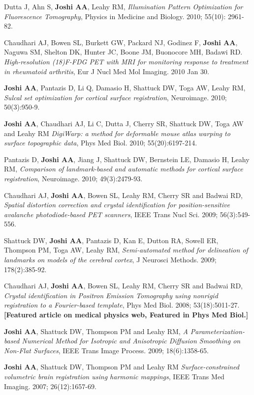 \documentclass[overlapped,line,letterpaper]{res}
\begin{document}
\begin{resume}
Dutta J, Ahn S, \textbf{Joshi AA}, Leahy RM, \textit{Illumination Pattern Optimization for Fluorescence Tomography}, Physics in Medicine and Biology. 2010; 55(10): 2961-82.

Chaudhari AJ, Bowen SL, Burkett GW, Packard NJ, Godinez F, \textbf{Joshi AA}, Naguwa SM, Shelton DK, Hunter JC, Boone JM, Buonocore MH, Badawi RD. \textit{High-resolution (18)F-FDG PET with MRI for monitoring response to treatment in rheumatoid arthritis}, Eur J Nucl Med Mol Imaging. 2010 Jan 30.

\textbf{Joshi AA}, Pantazis D, Li Q, Damasio H, Shattuck DW, Toga AW, Leahy RM, \textit{Sulcal set optimization for cortical surface registration}, Neuroimage. 2010; 50(3):950-9.

\textbf{Joshi AA}, Chaudhari AJ,  Li C, Dutta J, Cherry SR, Shattuck DW, Toga AW and Leahy RM \textit{DigiWarp: a method for deformable mouse atlas warping to surface topographic data}, Phys Med Biol. 2010; 55(20):6197-214.

Pantazis D, \textbf{Joshi AA}, Jiang J, Shattuck DW, Bernstein LE, Damasio H, Leahy RM, \textit{Comparison of landmark-based and automatic methods for cortical surface registration}, Neuroimage. 2010; 49(3):2479-93.

Chaudhari AJ, \textbf{Joshi AA}, Bowen SL, Leahy RM, Cherry SR and Badwai RD, \textit{Spatial distortion correction and crystal identification for position-sensitive avalanche photodiode-based PET scanners}, IEEE Trans Nucl Sci. 2009; 56(3):549-556.

Shattuck DW, \textbf{Joshi AA}, Pantazis D, Kan E, Dutton RA, Sowell ER, Thompson PM, Toga AW, Leahy RM, \textit{Semi-automated method for delineation of landmarks on models of the cerebral cortex}, J Neurosci Methods. 2009; 178(2):385-92.

Chaudhari AJ, \textbf{Joshi AA}, Bowen SL, Leahy RM, Cherry SR and Badwai RD, \textit{Crystal identification in Positron Emission Tomography using nonrigid registration to a Fourier-based template}, Phys Med Biol. 2008; 53(18):5011-27. \textbf{[Featured article on medical physics web, Featured in Phys Med Biol.]}

\textbf{Joshi AA}, Shattuck DW, Thompson PM and Leahy RM, \textit{A Parameterization-based Numerical Method for Isotropic and Anisotropic Diffusion Smoothing on Non-Flat Surfaces}, IEEE Trans Image Process. 2009; 18(6):1358-65.

\textbf{Joshi AA}, Shattuck DW, Thompson PM and Leahy RM \textit{Surface-constrained volumetric brain registration using harmonic mappings}, IEEE Trans Med Imaging. 2007; 26(12):1657-69.


\end{resume}
\end{document}
